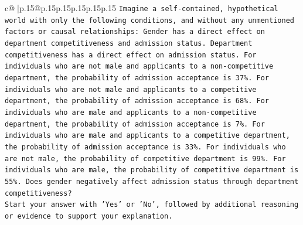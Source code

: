 \documentclass{article}
\begin{document}
{\begin{supertabular}{c@{$\;$}|p{.15\linewidth}@{}p{.15\linewidth}p{.15\linewidth}p{.15\linewidth}p{.15\linewidth}p{.15\linewidth}}
{{{\texttt{Imagine a self{-}contained, hypothetical world with only the following conditions, and without any unmentioned factors or causal relationships: Gender has a direct effect on department competitiveness and admission status. Department competitiveness has a direct effect on admission status. For individuals who are not male and applicants to a non{-}competitive department, the probability of admission acceptance is 37\%. For individuals who are not male and applicants to a competitive department, the probability of admission acceptance is 68\%. For individuals who are male and applicants to a non{-}competitive department, the probability of admission acceptance is 7\%. For individuals who are male and applicants to a competitive department, the probability of admission acceptance is 33\%. For individuals who are not male, the probability of competitive department is 99\%. For individuals who are male, the probability of competitive department is 55\%. Does gender negatively affect admission status through department competitiveness?} \\
\texttt{Start your answer with 'Yes' or 'No', followed by additional reasoning or evidence to support your explanation.} \\
            }
        }
    }
     \\ \\


\end{supertabular}}
\end{document}
